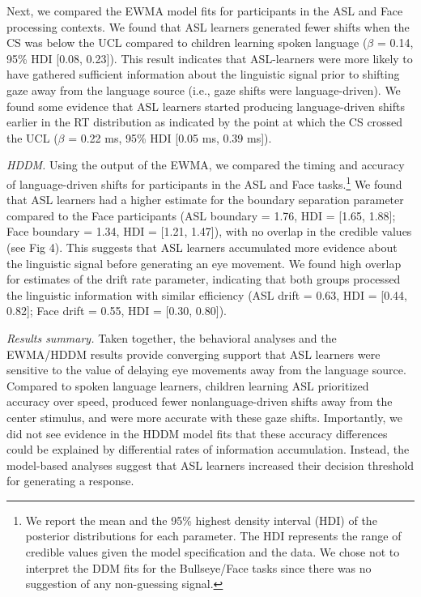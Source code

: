 \documentclass[english,floatsintext,man]{apa6}
\theoremstyle{definition}
\theoremstyle{definition}
\theoremstyle{definition}
\theoremstyle{remark}
\begin{document}
Next, we compared the EWMA model fits for participants in the ASL and
Face processing contexts. We found that ASL learners generated fewer
shifts when the CS was below the UCL compared to children learning
spoken language (\(\beta\) = 0.14, 95\% HDI {[}0.08, 0.23{]}). This
result indicates that ASL-learners were more likely to have gathered
sufficient information about the linguistic signal prior to shifting
gaze away from the language source (i.e., gaze shifts were
language-driven). We found some evidence that ASL learners started
producing language-driven shifts earlier in the RT distribution as
indicated by the point at which the CS crossed the UCL (\(\beta\) = 0.22
ms, 95\% HDI {[}0.05 ms, 0.39 ms{]}).

\emph{HDDM.} Using the output of the EWMA, we compared the timing and
accuracy of language-driven shifts for participants in the ASL and Face
tasks.\footnote{We report the mean and the 95\% highest density interval
  (HDI) of the posterior distributions for each parameter. The HDI
  represents the range of credible values given the model specification
  and the data. We chose not to interpret the DDM fits for the
  Bullseye/Face tasks since there was no suggestion of any non-guessing
  signal.} We found that ASL learners had a higher estimate for the
boundary separation parameter compared to the Face participants (ASL
boundary = 1.76, HDI = {[}1.65, 1.88{]}; Face boundary = 1.34, HDI =
{[}1.21, 1.47{]}), with no overlap in the credible values (see Fig 4).
This suggests that ASL learners accumulated more evidence about the
linguistic signal before generating an eye movement. We found high
overlap for estimates of the drift rate parameter, indicating that both
groups processed the linguistic information with similar efficiency (ASL
drift = 0.63, HDI = {[}0.44, 0.82{]}; Face drift = 0.55, HDI = {[}0.30,
0.80{]}).

\emph{Results summary.} Taken together, the behavioral analyses and the
EWMA/HDDM results provide converging support that ASL learners were
sensitive to the value of delaying eye movements away from the language
source. Compared to spoken language learners, children learning ASL
prioritized accuracy over speed, produced fewer nonlanguage-driven
shifts away from the center stimulus, and were more accurate with these
gaze shifts. Importantly, we did not see evidence in the HDDM model fits
that these accuracy differences could be explained by differential rates
of information accumulation. Instead, the model-based analyses suggest
that ASL learners increased their decision threshold for generating a
response.
\end{document}
